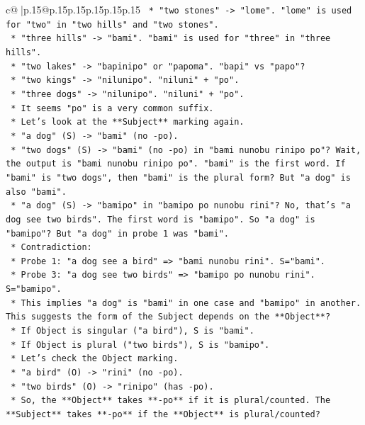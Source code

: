 \documentclass{article}
\begin{document}
{\begin{supertabular}{c@{$\;$}|p{.15\linewidth}@{}p{.15\linewidth}p{.15\linewidth}p{.15\linewidth}p{.15\linewidth}p{.15\linewidth}}
{{{\texttt{        *   "two stones" {-}> "lome". "lome" is used for "two" in "two hills" and "two stones".} \\
\texttt{        *   "three hills" {-}> "bami". "bami" is used for "three" in "three hills".} \\
\texttt{        *   "two lakes" {-}> "bapinipo" or "papoma". "bapi" vs "papo"?} \\
\texttt{        *   "two kings" {-}> "nilunipo". "niluni" + "po".} \\
\texttt{        *   "three dogs" {-}> "nilunipo". "niluni" + "po".} \\
\texttt{        *   It seems "po" is a very common suffix.} \\
\texttt{    *   Let's look at the **Subject** marking again.} \\
\texttt{        *   "a dog" (S) {-}> "bami" (no {-}po).} \\
\texttt{        *   "two dogs" (S) {-}> "bami" (no {-}po) in "bami nunobu rinipo po"? Wait, the output is "bami nunobu rinipo po". "bami" is the first word. If "bami" is "two dogs", then "bami" is the plural form? But "a dog" is also "bami".} \\
\texttt{        *   "a dog" (S) {-}> "bamipo" in "bamipo po nunobu rini"? No, that's "a dog see two birds". The first word is "bamipo". So "a dog" is "bamipo"? But "a dog" in probe 1 was "bami".} \\
\texttt{        *   Contradiction:} \\
\texttt{            *   Probe 1: "a dog see a bird" => "bami nunobu rini". S="bami".} \\
\texttt{            *   Probe 3: "a dog see two birds" => "bamipo po nunobu rini". S="bamipo".} \\
\texttt{        *   This implies "a dog" is "bami" in one case and "bamipo" in another. This suggests the form of the Subject depends on the **Object**?} \\
\texttt{            *   If Object is singular ("a bird"), S is "bami".} \\
\texttt{            *   If Object is plural ("two birds"), S is "bamipo".} \\
\texttt{        *   Let's check the Object marking.} \\
\texttt{            *   "a bird" (O) {-}> "rini" (no {-}po).} \\
\texttt{            *   "two birds" (O) {-}> "rinipo" (has {-}po).} \\
\texttt{        *   So, the **Object** takes **{-}po** if it is plural/counted. The **Subject** takes **{-}po** if the **Object** is plural/counted?} \\
}}}
\end{supertabular}}
\end{document}

